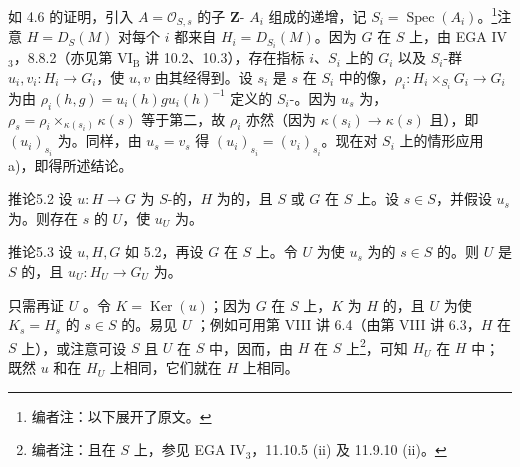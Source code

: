 如 4.6 的证明，引入 $A=\mathcal O_{S,s}$ 的子 $\mathbf Z$- $A_i$ 组成的递增，记 $S_i=\operatorname{Spec}(A_i)$。\footnote{编者注：以下展开了原文。}注意 $H=D_S(M)$ 对每个 $i$ 都来自 $H_i=D_{S_i}(M)$。因为 $G$ 在 $S$ 上，由 EGA IV$_3$，8.8.2（亦见第 VI$_{\mathrm B}$ 讲 10.2、10.3），存在指标 $i$、$S_i$ 上的 $G_i$ 以及 $S_i$-群 $u_i,v_i:H_i\to G_i$，使 $u,v$ 由其经得到。设 $s_i$ 是 $s$ 在 $S_i$ 中的像，$\rho_i:H_i\times_{S_i}G_i\to G_i$ 为由 $\rho_i(h,g)=u_i(h)gu_i(h)^{-1}$ 定义的 $S_i$-。因为 $u_s$ 为，$\rho_s=\rho_i\times_{\kappa(s_i)}\kappa(s)$ 等于第二，故 $\rho_i$ 亦然（因为 $\kappa(s_i)\to\kappa(s)$ 且），即 $(u_i)_{s_i}$ 为。同样，由 $u_s=v_s$ 得 $(u_i)_{s_i}=(v_i)_{s_i}$。现在对 $S_i$ 上的情形应用 a)，即得所述结论。
\begin{SGAresult}{推论}{5.2}
设 $u:H\to G$ 为 $S$-的，$H$ 为的，且 $S$ 或 $G$ 在 $S$ 上。设 $s\in S$，并假设 $u_s$ 为。则存在 $s$ 的 $U$，使 $u_U$ 为。
\end{SGAresult}
\begin{SGAresult}{推论}{5.3}
设 $u,H,G$ 如 5.2，再设 $G$ 在 $S$ 上。令 $U$ 为使 $u_s$ 为的 $s\in S$ 的。则 $U$ 是 $S$ 的，且 $u_U:H_U\to G_U$ 为。
\end{SGAresult}
只需再证 $U$ 。令 $K=\operatorname{Ker}(u)$；因为 $G$ 在 $S$ 上，$K$ 为 $H$ 的，且 $U$ 为使 $K_s=H_s$ 的 $s\in S$ 的。易见 $U$ ；例如可用第 VIII 讲 6.4（由第 VIII 讲 6.3，$H$ 在 $S$ 上），或注意可设 $S$ 且 $U$ 在 $S$ 中，因而，由 $H$ 在 $S$ 上\footnote{编者注：且在 $S$ 上，参见 EGA IV$_3$，11.10.5 (ii) 及 11.9.10 (ii)。}，可知 $H_U$ 在 $H$ 中；既然 $u$ 和在 $H_U$ 上相同，它们就在 $H$ 上相同。
